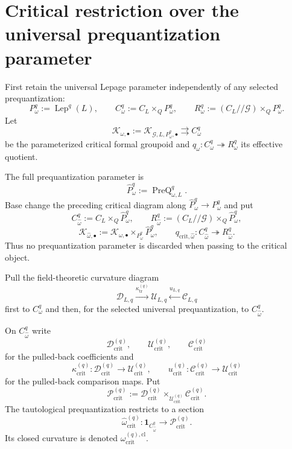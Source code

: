 \section{Critical restriction over the universal prequantization parameter}
\label{sec:prequantum-critical-restriction}

First retain the universal Lepage parameter independently of any selected
prequantization:
\[
P_\omega^q:=\operatorname{Lep}^q(L),
\qquad
C_\omega^q:=C_L\times_QP_\omega^q,
\qquad
R_\omega^q:=(C_L//\mathcal G)\times_QP_\omega^q.
\]
Let
\[
\mathcal K_{\omega,\bullet}
:=
\mathcal K_{\mathcal G,L,P_\omega^q,\bullet}
\rightrightarrows C_\omega^q
\]
be the parameterized critical formal groupoid and
$q_\omega:C_\omega^q\twoheadrightarrow R_\omega^q$ its effective quotient.

The full prequantization parameter is
\[
\widehat P_\omega^q
:=
\operatorname{PreQ}_{\omega,L}^{q}.
\]
Base change the preceding critical diagram along
$\widehat P_\omega^q\to P_\omega^q$ and put
\[
C_{\widehat\omega}^q
:=
C_L\times_Q\widehat P_\omega^q,
\qquad
R_{\widehat\omega}^q
:=
(C_L//\mathcal G)\times_Q\widehat P_\omega^q,
\]
\[
\mathcal K_{\widehat\omega,\bullet}
:=
\mathcal K_{\omega,\bullet}\times_{P_\omega^q}\widehat P_\omega^q,
\qquad
q_{\mathrm{crit},\widehat\omega}:
C_{\widehat\omega}^q\twoheadrightarrow R_{\widehat\omega}^q.
\]
Thus no prequantization parameter is discarded when passing to the critical
object.

Pull the field-theoretic curvature diagram
\[
\mathscr D_{L,q}
\xrightarrow{\kappa_{\mathrm{tr}}^{(q)}}
\mathscr U_{L,q}
\xleftarrow{u_{L,q}}
\mathscr C_{L,q}
\]
first to $C_\omega^q$ and then, for the selected universal prequantization, to
$C_{\widehat\omega}^q$.

\begin{construction}
\label{constr:prequantum-raw-critical-restriction}
On $C_{\widehat\omega}^q$ write
\[
\mathscr D_{\mathrm{crit}}^{(q)},
\qquad
\mathscr U_{\mathrm{crit}}^{(q)},
\qquad
\mathscr C_{\mathrm{crit}}^{(q)}
\]
for the pulled-back coefficients and
\[
\kappa_{\mathrm{crit}}^{(q)}:
\mathscr D_{\mathrm{crit}}^{(q)}\to\mathscr U_{\mathrm{crit}}^{(q)},
\qquad
u_{\mathrm{crit}}^{(q)}:
\mathscr C_{\mathrm{crit}}^{(q)}\to\mathscr U_{\mathrm{crit}}^{(q)}
\]
for the pulled-back comparison maps.  Put
\[
\mathscr P_{\mathrm{crit}}^{(q)}
:=
\mathscr D_{\mathrm{crit}}^{(q)}
\times_{\mathscr U_{\mathrm{crit}}^{(q)}}
\mathscr C_{\mathrm{crit}}^{(q)}.
\]
The tautological prequantization restricts to a section
\[
\boxed{
\widehat\omega_{\mathrm{crit}}^{(q)}:
\mathbf1_{C_{\widehat\omega}^q}
\longrightarrow
\mathscr P_{\mathrm{crit}}^{(q)}.
}
\]
Its closed curvature is denoted
$\omega_{\mathrm{crit}}^{(q),\mathrm{cl}}$.
\end{construction}

